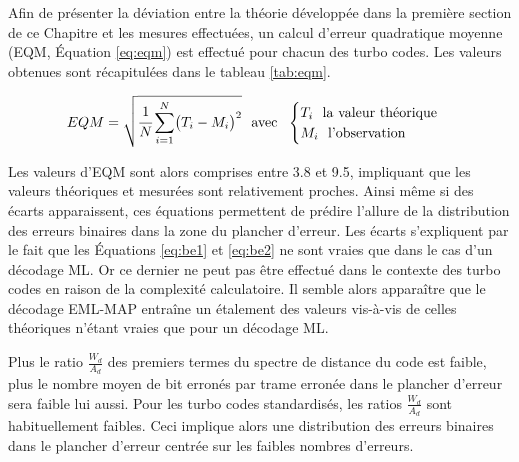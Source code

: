 Afin de présenter la déviation entre la théorie développée dans la première section de ce Chapitre et les mesures 
effectuées, un calcul d'erreur quadratique moyenne (EQM, Équation \ref{eq:eqm}) est effectué pour chacun des turbo codes. 
Les valeurs obtenues sont récapitulées dans le tableau \ref{tab:eqm}.

\begin{equation}
	EQM = \sqrt{\cfrac{1}{N}\sum\limits_{i=1}^N\bigl(T_i-M_i\bigr)^2} \text{~~avec~~} \begin{cases}
		T_i \text{~~la valeur théorique} \\
		M_i \text{~~l'observation}
		\end{cases}
	\label{eq:eqm}
\end{equation}

Les valeurs d'EQM sont alors comprises entre 3.8 et 9.5, impliquant que les valeurs théoriques et mesurées sont 
relativement proches. Ainsi même si des écarts apparaissent, ces équations permettent de prédire l'allure de la distribution
des erreurs binaires dans la zone du plancher d'erreur. Les écarts s'expliquent par le fait que les Équations \ref{eq:be1} 
et \ref{eq:be2} ne sont vraies que dans le cas d'un décodage ML. Or ce dernier ne peut pas être effectué dans le contexte 
des turbo codes en raison de la complexité calculatoire. Il semble alors apparaître que le décodage EML-MAP entraîne un 
étalement des valeurs vis-à-vis de celles théoriques n'étant vraies que pour un décodage ML.

Plus le ratio $\frac{W_d}{A_d}$ des premiers termes du spectre de distance du code est faible, plus le nombre moyen de 
bit erronés par trame erronée dans le plancher d'erreur sera faible lui aussi. Pour les turbo codes 
standardisés, les ratios $\frac{W_d}{A_d}$ sont habituellement faibles. Ceci implique alors une distribution des erreurs 
binaires dans le plancher d'erreur centrée sur les faibles nombres d'erreurs.
\begin{table}[t]
\centering
\caption{Erreur quadratique moyenne entre les valeurs théoriques et les simulations Monte-Carlo}
\label{tab:eqm}
\vspace*{-1em}
\end{table}


